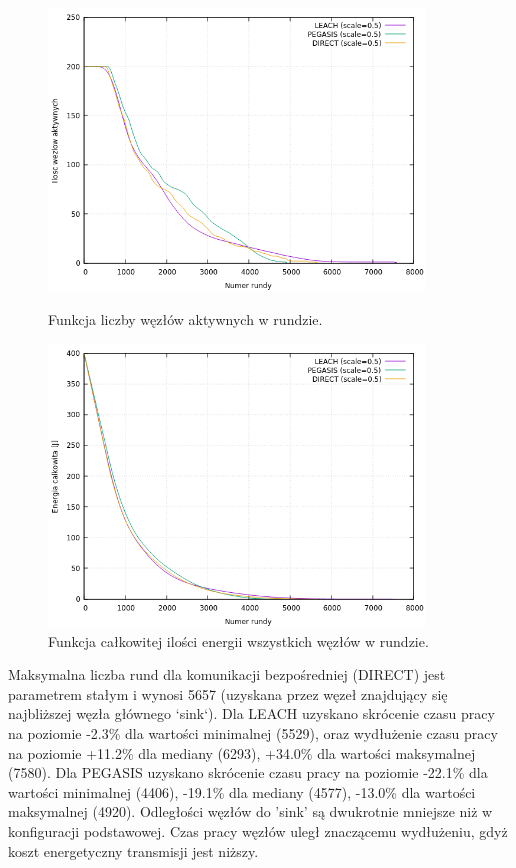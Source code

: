 \documentclass[a4paper,12pt,twoside,openany]{report}
\begin{document}
\begin{figure}[H]
 \centering
 \includegraphics[width=10cm]{images/gnuplot/test_3/nodes_in_round_xy100.png}
 \caption{Funkcja liczby węzłów aktywnych w rundzie.}
 \includegraphics[width=10cm]{images/gnuplot/test_3/energy_in_round_xy100.png}
 \caption{Funkcja całkowitej ilości energii wszystkich węzłów w rundzie.}
\end{figure}

\par
Maksymalna liczba rund dla komunikacji bezpośredniej (DIRECT) jest parametrem stałym i wynosi 5657 (uzyskana przez węzeł znajdujący się najbliższej węzła głównego `sink`).
Dla LEACH uzyskano skrócenie czasu pracy na poziomie -2.3\% dla wartości minimalnej (5529), oraz wydłużenie czasu pracy na poziomie +11.2\% dla mediany (6293), +34.0\% dla wartości maksymalnej (7580).
Dla PEGASIS uzyskano skrócenie czasu pracy na poziomie -22.1\% dla wartości minimalnej (4406), -19.1\% dla mediany (4577), -13.0\% dla wartości maksymalnej (4920).
Odległości węzłów do 'sink' są dwukrotnie mniejsze niż w konfiguracji podstawowej. Czas pracy węzłów uległ znaczącemu wydłużeniu, gdyż koszt energetyczny transmisji jest niższy.
\end{document}

